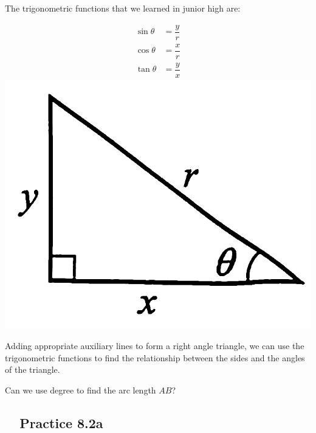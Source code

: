 \documentclass{report}
\newcommand{\practice}[1]{%
    \subsection*{\faFlag\ \ Practice #1\hspace{0.5em}\xrfill[0.175\baselineskip]{1pt}}
}
\begin{document}
\begin{info}
        
    \noindent The trigonometric functions that we learned in junior high are:
    \begin{multicols}{2}
        \vspace*{-3em}
        \begin{align*}
            \sin \theta &= \dfrac{y}{r}\\
            \cos \theta &= \dfrac{x}{r}\\
            \tan \theta &= \dfrac{y}{x}
        \end{align*}
        \columnbreak
        \includegraphics[scale=0.12]{assets/8-8.png}
    \end{multicols}
    \vspace{-2em}
    Adding appropriate auxiliary lines to form a right angle triangle, we can use the trigonometric functions to find the relationship between the sides and the angles of the triangle.
\end{info}
\vspace{1em}
\begin{think}
   
    \noindent Can we use degree to find the arc length $AB$?
\end{think}

\practice{8.2a}
\end{document}
